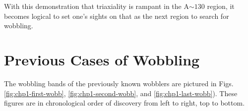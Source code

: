With this demonstration that triaxiality is rampant in the A$\sim{}130$ region, it becomes logical to set one's sights on that as the next region to search for wobbling. 

\section{Previous Cases of Wobbling}
\label{sec:trw-prev}
The wobbling bands of the previously known wobblers are pictured in Figs. \ref{fig:chp1-first-wobb}, \ref{fig:chp1-second-wobb}, and \ref{fig:chp1-last-wobb}). These figures are in chronological order of discovery from left to right, top to bottom.%

